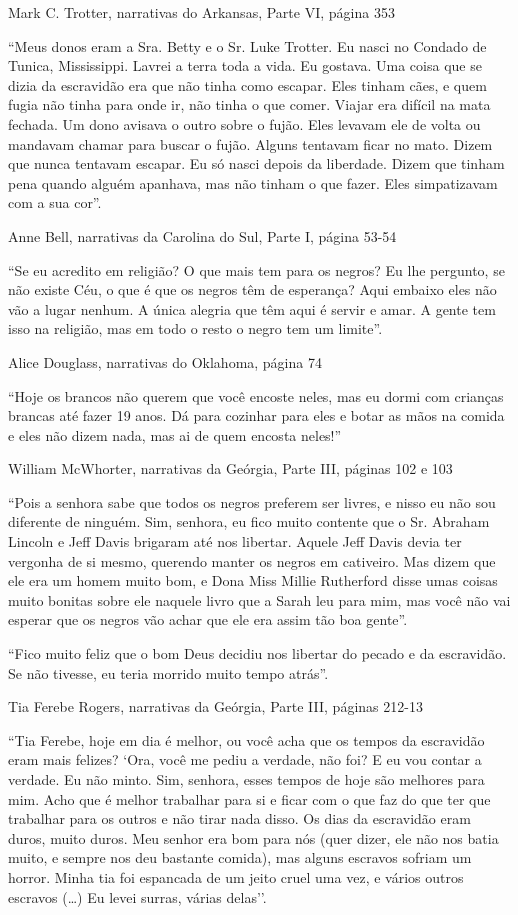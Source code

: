 Mark C. Trotter, narrativas do Arkansas, Parte VI, página 353

``Meus donos eram a Sra. Betty e o Sr. Luke Trotter. Eu nasci no Condado
de Tunica, Mississippi. Lavrei a terra toda a vida. Eu gostava. Uma
coisa que se dizia da escravidão era que não tinha como escapar. Eles
tinham cães, e quem fugia não tinha para onde ir, não tinha o que comer.
Viajar era difícil na mata fechada. Um dono avisava o outro sobre o
fujão. Eles levavam ele de volta ou mandavam chamar para buscar o fujão.
Alguns tentavam ficar no mato. Dizem que nunca tentavam escapar. Eu só
nasci depois da liberdade. Dizem que tinham pena quando alguém apanhava,
mas não tinham o que fazer. Eles simpatizavam com a sua cor''.

Anne Bell, narrativas da Carolina do Sul, Parte I, página 53-54

``Se eu acredito em religião? O que mais tem para os negros? Eu lhe
pergunto, se não existe Céu, o que é que os negros têm de esperança?
Aqui embaixo eles não vão a lugar nenhum. A única alegria que têm aqui é
servir e amar. A gente tem isso na religião, mas em todo o resto o negro
tem um limite''.

Alice Douglass, narrativas do Oklahoma, página 74

``Hoje os brancos não querem que você encoste neles, mas eu dormi com
crianças brancas até fazer 19 anos. Dá para cozinhar para eles e botar
as mãos na comida e eles não dizem nada, mas ai de quem encosta neles!''

William McWhorter, narrativas da Geórgia, Parte III, páginas 102 e 103

``Pois a senhora sabe que todos os negros preferem ser livres, e nisso
eu não sou diferente de ninguém. Sim, senhora, eu fico muito contente
que o Sr. Abraham Lincoln e Jeff Davis brigaram até nos libertar. Aquele
Jeff Davis devia ter vergonha de si mesmo, querendo manter os negros em
cativeiro. Mas dizem que ele era um homem muito bom, e Dona Miss Millie
Rutherford disse umas coisas muito bonitas sobre ele naquele livro que a
Sarah leu para mim, mas você não vai esperar que os negros vão achar que
ele era assim tão boa gente''.

``Fico muito feliz que o bom Deus decidiu nos libertar do pecado e da
escravidão. Se não tivesse, eu teria morrido muito tempo atrás''.

Tia Ferebe Rogers, narrativas da Geórgia, Parte III, páginas 212-13

``Tia Ferebe, hoje em dia é melhor, ou você acha que os tempos da
escravidão eram mais felizes? `Ora, você me pediu a verdade, não foi? E
eu vou contar a verdade. Eu não minto. Sim, senhora, esses tempos de
hoje são melhores para mim. Acho que é melhor trabalhar para si e ficar
com o que faz do que ter que trabalhar para os outros e não tirar nada
disso. Os dias da escravidão eram duros, muito duros. Meu senhor era bom
para nós (quer dizer, ele não nos batia muito, e sempre nos deu bastante
comida), mas alguns escravos sofriam um horror. Minha tia foi espancada
de um jeito cruel uma vez, e vários outros escravos (\ldots{}) Eu levei
surras, várias delas''.

